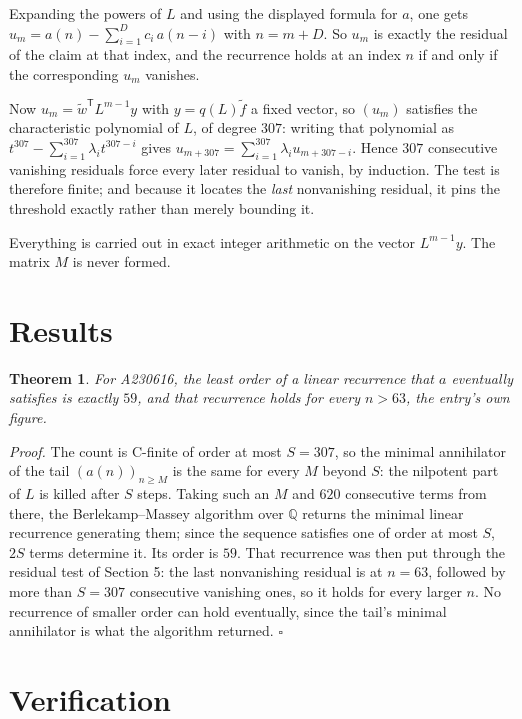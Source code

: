 \documentclass[11pt]{article}
\newtheorem{theorem}{Theorem}
\theoremstyle{definition}
\begin{document}
Expanding the powers of $L$ and using the displayed formula for $a$, one gets $u_m = a(n) - \sum_{i=1}^{D} c_i\,a(n-i)$ with $n = m + D$. So $u_m$ is exactly the residual of the claim at that index, and the recurrence holds at an index $n$ if and only if the corresponding $u_m$ vanishes.

Now $u_m = \tilde w^{\mathsf T} L^{m-1} y$ with $y = q(L)\tilde f$ a fixed vector, so $(u_m)$ satisfies the characteristic polynomial of $L$, of degree $307$: writing that polynomial as $t^{307} - \sum_{i=1}^{307} \lambda_i t^{307-i}$ gives $u_{m+307} = \sum_{i=1}^{307} \lambda_i u_{m+307-i}$. Hence $307$ consecutive vanishing residuals force every later residual to vanish, by induction. The test is therefore finite; and because it locates the {\itshape last} nonvanishing residual, it pins the threshold exactly rather than merely bounding it.

Everything is carried out in exact integer arithmetic on the vector $L^{m-1}y$. The matrix $M$ is never formed.

\section{Results}

\begin{theorem} For A230616, the least order of a linear recurrence that $a$ eventually satisfies is exactly $59$, and that recurrence holds for every $n > 63$, the entry's own figure.\end{theorem}

{\itshape Proof.} The count is C-finite of order at most $S = 307$, so the minimal annihilator of the tail $(a(n))_{n \ge M}$ is the same for every $M$ beyond $S$: the nilpotent part of $L$ is killed after $S$ steps. Taking such an $M$ and $620$ consecutive terms from there, the Berlekamp--Massey algorithm over $\mathbb{Q}$ returns the minimal linear recurrence generating them; since the sequence satisfies one of order at most $S$, $2S$ terms determine it. Its order is $59$. That recurrence was then put through the residual test of Section 5: the last nonvanishing residual is at $n = 63$, followed by more than $S = 307$ consecutive vanishing ones, so it holds for every larger $n$. No recurrence of smaller order can hold eventually, since the tail's minimal annihilator is what the algorithm returned. $\square$

\section{Verification}
\end{document}
